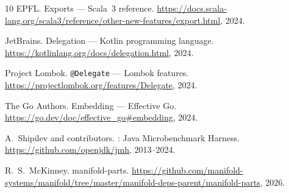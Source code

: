 \documentclass[sigplan,10pt,review,anonymous]{acmart}
\theoremstyle{acmplain}
\begin{document}
\begin{thebibliography}{10}
EPFL.
\newblock Exports --- {Scala~3} reference.
\newblock \url{https://docs.scala-lang.org/scala3/reference/other-new-features/export.html}, 2024.

JetBrains.
\newblock Delegation --- {Kotlin} programming language.
\newblock \url{https://kotlinlang.org/docs/delegation.html}, 2024.

Project Lombok.
\newblock \texttt{@Delegate} --- {Lombok} features.
\newblock \url{https://projectlombok.org/features/Delegate}, 2024.

The Go Authors.
\newblock Embedding --- Effective {Go}.
\newblock \url{https://go.dev/doc/effective_go#embedding}, 2024.

A.~Shipilev and contributors.
: Java Microbenchmark Harness.
\newblock \url{https://github.com/openjdk/jmh}, 2013--2024.

R.~S.~McKinney.
\newblock manifold-parts.
\newblock \url{https://github.com/manifold-systems/manifold/tree/master/manifold-deps-parent/manifold-parts}, 2026.

\end{thebibliography}
\end{document}

